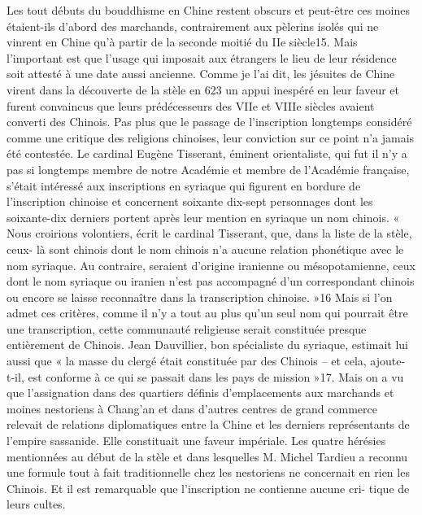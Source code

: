 Les tout débuts du bouddhisme en Chine restent obscurs et peut-être ces
moines étaient-ils d'abord des marchands, contrairement aux pèlerins
isolés qui ne vinrent en Chine qu'à partir de la seconde moitié du IIe
siècle15. Mais l'important est que l'usage qui imposait aux étrangers le
lieu de leur résidence soit attesté à une date aussi ancienne.
Comme je l'ai dit, les jésuites de Chine virent dans la découverte de
la stèle en 623 un appui inespéré en leur faveur et furent convaincus
que leurs prédécesseurs des VIIe et VIIIe siècles avaient converti des
Chinois. Pas plus que le passage de l'inscription longtemps considéré
comme une critique des religions chinoises, leur
conviction sur ce point n'a jamais été contestée. Le cardinal Eugène
Tisserant, éminent orientaliste, qui fut il n'y a pas si longtemps
membre de notre Académie et membre de l'Académie française, s'était
intéressé aux inscriptions en syriaque qui figurent en bordure de
l'inscription chinoise et concernent soixante dix-sept personnages dont
les soixante-dix derniers portent après leur mention en syriaque un nom
chinois. « Nous croirions volontiers, écrit le cardinal Tisserant,
que, dans la liste de la stèle, ceux- là sont chinois dont le nom
chinois n'a aucune relation phonétique avec le nom syriaque. Au
contraire, seraient d'origine iranienne ou mésopotamienne, ceux dont le
nom syriaque ou iranien n'est pas accompagné d'un correspondant chinois
ou encore se laisse reconnaître dans la transcription chinoise. »16 Mais
si l'on admet ces critères, comme il n'y a tout au plus qu'un seul nom
qui pourrait être une transcription, cette communauté religieuse serait
constituée presque entièrement de Chinois. Jean Dauvillier, bon
spécialiste du syriaque, estimait lui aussi que « la masse du clergé
était constituée par des Chinois -- et cela, ajoute- t-il, est conforme
à ce qui se passait dans les pays de mission »17. Mais on a vu que
l'assignation dans des quartiers définis d'emplacements aux marchands
et moines nestoriens à Chang'an et dans d'autres centres de grand
commerce relevait de relations diplomatiques entre la Chine et les
derniers représentants de l'empire sassanide. Elle constituait une
faveur impériale. Les quatre hérésies mentionnées au début de la stèle
et dans lesquelles M. Michel Tardieu a reconnu une formule tout à fait
traditionnelle chez les nestoriens ne concernait en rien les Chinois.
Et il est remarquable que l'inscription ne contienne aucune cri-
tique de leurs cultes.

